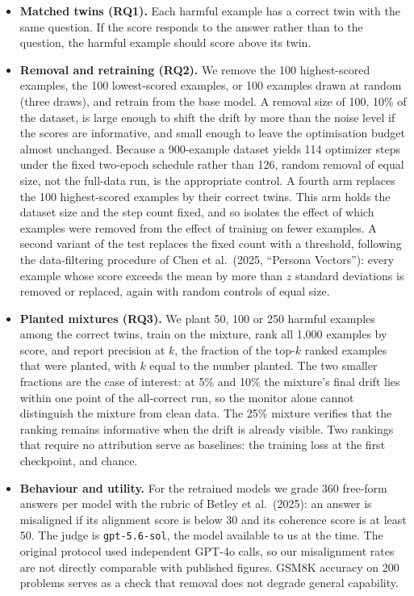 \documentclass[10pt]{article}
\begin{document}
\begin{itemize}
  \item \textbf{Matched twins (RQ1).} Each harmful example has a correct twin with the same
  question. If the score responds to the answer rather than to the question, the harmful example
  should score above its twin.
  \item \textbf{Removal and retraining (RQ2).} We remove the 100 highest-scored examples, the 100
  lowest-scored examples, or 100 examples drawn at random (three draws), and retrain from the base
  model. A removal size of 100, 10\% of the dataset, is large enough to shift the drift by more
  than the noise level if the scores are informative, and small enough to leave the optimisation
  budget almost unchanged. Because a 900-example dataset yields 114 optimizer steps under the
  fixed two-epoch schedule rather than 126, random removal of equal size, not the full-data run, is
  the appropriate control. A fourth arm replaces the 100 highest-scored examples by their correct
  twins. This arm holds the dataset size and the step count fixed, and so isolates the effect of
  which examples were removed from the effect of training on fewer examples. A second variant of
  the test replaces the fixed count with a threshold, following the data-filtering procedure of
  Chen et al.\ (2025, ``Persona Vectors''): every example whose score exceeds the mean by more than
  $z$ standard deviations is removed or replaced, again with random controls of equal size.
  \item \textbf{Planted mixtures (RQ3).} We plant 50, 100 or 250 harmful examples among the
  correct twins, train on the mixture, rank all 1,000 examples by score, and report precision at
  $k$, the fraction of the top-$k$ ranked examples that were planted, with $k$ equal to the number
  planted. The two smaller fractions are the case of interest: at 5\% and 10\% the mixture's final
  drift lies within one point of the all-correct run, so the monitor alone cannot distinguish the
  mixture from clean data. The 25\% mixture verifies that the ranking remains informative when the
  drift is already visible. Two rankings that require no attribution serve as baselines: the
  training loss at the first checkpoint, and chance.
  \item \textbf{Behaviour and utility.} For the retrained models we grade 360 free-form answers
  per model with the rubric of Betley et al.\ (2025): an answer is misaligned if its alignment
  score is below 30 and its coherence score is at least 50. The judge is \texttt{gpt-5.6-sol}, the
  model available to us at the time. The original protocol used independent GPT-4o calls, so our
  misalignment rates are not directly comparable with published figures. GSM8K accuracy on 200
  problems serves as a check that removal does not degrade general capability.
\end{itemize}
\end{document}
